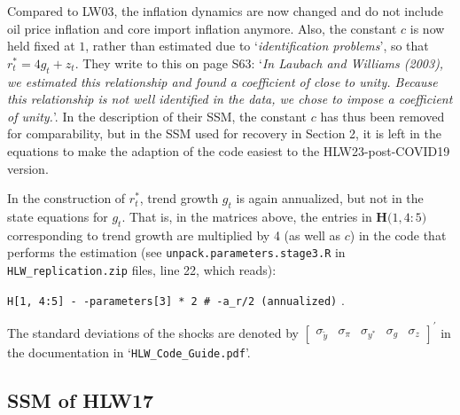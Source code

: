 \documentclass[a4paper,12pt]{article}
\begin{document}
Compared to LW03, the inflation dynamics are now changed and do not include
oil price inflation and core import inflation anymore. Also, the constant $c$
is now held fixed at $1$, rather than estimated due to `\emph{identification
problems}', so that $r_{t}^{\ast }=4g_{t}+z_{t}$. They write to this on page
S63: `\emph{In Laubach and Williams (2003), we estimated this relationship
and found a coefficient of close to unity. Because this relationship is not
well identified in the data, we chose to impose a coefficient of unity.}'. In
the description of their SSM, the constant $c$ has thus been removed for
comparability, but in the SSM used for recovery in Section 2, it is left in
the equations to make the adaption of the code easiest to the
HLW23-post-COVID19 version.

In the construction of $r_{t}^{\ast }$, trend growth $g_{t}$ is again
annualized, but not in the state equations for $g_{t}$. That is, in the
matrices above, the entries in $\mathbf{H(}1,4:5\mathbf{)}$ corresponding to
trend growth are multiplied by 4 (as well as $c$) in the code that performs
the estimation (see \texttt{unpack.parameters.stage3.R} in \texttt{%
HLW\_replication.zip} files, line 22, which reads):\

\texttt{H[1, 4:5] \TEXTsymbol{<}- -parameters[3] * 2 \# -a\_r/2 (annualized)}%
.

\noindent The standard deviations of the shocks are denoted by $%
\begin{bmatrix}
\sigma _{\tilde{y}} & \sigma _{\pi } & \sigma _{y^{\ast }} & \sigma _{g} &
\sigma _{z}%
\end{bmatrix}%
^{\prime }$ in the documentation in `\texttt{HLW\_Code\_Guide.pdf}'.

\pagebreak

\subsection{SSM of HLW17}
\end{document}
